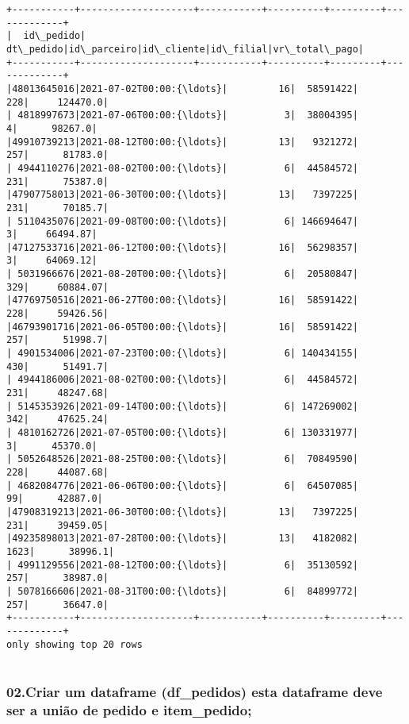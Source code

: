 \documentclass[11pt]{article}
\begin{document}
    \begin{Verbatim}[commandchars=\\\{\}]
+-----------+--------------------+-----------+----------+---------+-------------+
|  id\_pedido|           dt\_pedido|id\_parceiro|id\_cliente|id\_filial|vr\_total\_pago|
+-----------+--------------------+-----------+----------+---------+-------------+
|48013645016|2021-07-02T00:00:{\ldots}|         16|  58591422|      228|     124470.0|
| 4818997673|2021-07-06T00:00:{\ldots}|          3|  38004395|        4|      98267.0|
|49910739213|2021-08-12T00:00:{\ldots}|         13|   9321272|      257|      81783.0|
| 4944110276|2021-08-02T00:00:{\ldots}|          6|  44584572|      231|      75387.0|
|47907758013|2021-06-30T00:00:{\ldots}|         13|   7397225|      231|      70185.7|
| 5110435076|2021-09-08T00:00:{\ldots}|          6| 146694647|        3|     66494.87|
|47127533716|2021-06-12T00:00:{\ldots}|         16|  56298357|        3|     64069.12|
| 5031966676|2021-08-20T00:00:{\ldots}|          6|  20580847|      329|     60884.07|
|47769750516|2021-06-27T00:00:{\ldots}|         16|  58591422|      228|     59426.56|
|46793901716|2021-06-05T00:00:{\ldots}|         16|  58591422|      257|      51998.7|
| 4901534006|2021-07-23T00:00:{\ldots}|          6| 140434155|      430|      51491.7|
| 4944186006|2021-08-02T00:00:{\ldots}|          6|  44584572|      231|     48247.68|
| 5145353926|2021-09-14T00:00:{\ldots}|          6| 147269002|      342|     47625.24|
| 4810162726|2021-07-05T00:00:{\ldots}|          6| 130331977|        3|      45370.0|
| 5052648526|2021-08-25T00:00:{\ldots}|          6|  70849590|      228|     44087.68|
| 4682084776|2021-06-06T00:00:{\ldots}|          6|  64507085|       99|      42887.0|
|47908319213|2021-06-30T00:00:{\ldots}|         13|   7397225|      231|     39459.05|
|49235898013|2021-07-28T00:00:{\ldots}|         13|   4182082|     1623|      38996.1|
| 4991129556|2021-08-12T00:00:{\ldots}|          6|  35130592|      257|      38987.0|
| 5078166606|2021-08-31T00:00:{\ldots}|          6|  84899772|      257|      36647.0|
+-----------+--------------------+-----------+----------+---------+-------------+
only showing top 20 rows


    \end{Verbatim}

    \subsubsection{02.Criar um dataframe (df\_pedidos) esta dataframe deve
ser a união de pedido e
item\_pedido;}\label{criar-um-dataframe-df_pedidos-esta-dataframe-deve-ser-a-uniuxe3o-de-pedido-e-item_pedido}
\end{document}
